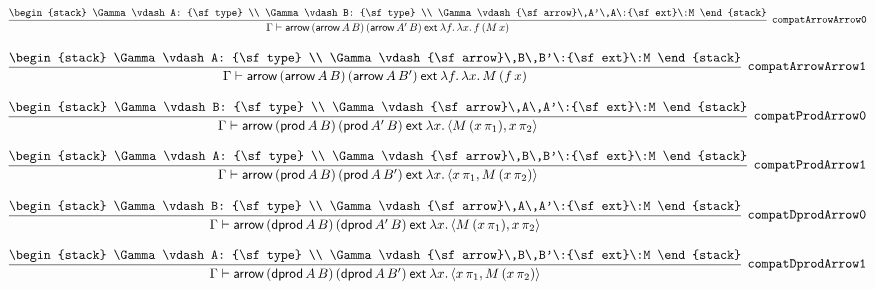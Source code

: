 \[
\infer[{\tt compatArrowArrow0}]{\Gamma \vdash {\sf arrow}\,({\sf arrow}\,A\,B)\,({\sf arrow}\,A'\,B)\:{\sf ext}\:\lambda f.\,\lambda x.\,f\,(M\,x)}{
\begin{stack}
\Gamma \vdash A: {\sf type}
\\
\Gamma \vdash B: {\sf type}
\\
\Gamma \vdash {\sf arrow}\,A'\,A\:{\sf ext}\:M
\end{stack}}
\]

\[
\infer[{\tt compatArrowArrow1}]{\Gamma \vdash {\sf arrow}\,({\sf arrow}\,A\,B)\,({\sf arrow}\,A\,B')\:{\sf ext}\:\lambda f.\,\lambda x.\,M\,(f\,x)}{
\begin{stack}
\Gamma \vdash A: {\sf type}
\\
\Gamma \vdash {\sf arrow}\,B\,B'\:{\sf ext}\:M
\end{stack}}
\]

\[
\infer[{\tt compatProdArrow0}]{\Gamma \vdash {\sf arrow}\,({\sf prod}\,A\,B)\,({\sf prod}\,A'\,B)\:{\sf ext}\:\lambda x.\,\langle M\,(x\, \pi_1),x\, \pi_2\rangle }{
\begin{stack}
\Gamma \vdash B: {\sf type}
\\
\Gamma \vdash {\sf arrow}\,A\,A'\:{\sf ext}\:M
\end{stack}}
\]

\[
\infer[{\tt compatProdArrow1}]{\Gamma \vdash {\sf arrow}\,({\sf prod}\,A\,B)\,({\sf prod}\,A\,B')\:{\sf ext}\:\lambda x.\,\langle x\, \pi_1,M\,(x\, \pi_2)\rangle }{
\begin{stack}
\Gamma \vdash A: {\sf type}
\\
\Gamma \vdash {\sf arrow}\,B\,B'\:{\sf ext}\:M
\end{stack}}
\]

\[
\infer[{\tt compatDprodArrow0}]{\Gamma \vdash {\sf arrow}\,({\sf dprod}\,A\,B)\,({\sf dprod}\,A'\,B)\:{\sf ext}\:\lambda x.\,\langle M\,(x\, \pi_1),x\, \pi_2\rangle }{
\begin{stack}
\Gamma \vdash B: {\sf type}
\\
\Gamma \vdash {\sf arrow}\,A\,A'\:{\sf ext}\:M
\end{stack}}
\]

\[
\infer[{\tt compatDprodArrow1}]{\Gamma \vdash {\sf arrow}\,({\sf dprod}\,A\,B)\,({\sf dprod}\,A\,B')\:{\sf ext}\:\lambda x.\,\langle x\, \pi_1,M\,(x\, \pi_2)\rangle }{
\begin{stack}
\Gamma \vdash A: {\sf type}
\\
\Gamma \vdash {\sf arrow}\,B\,B'\:{\sf ext}\:M
\end{stack}}
\]

